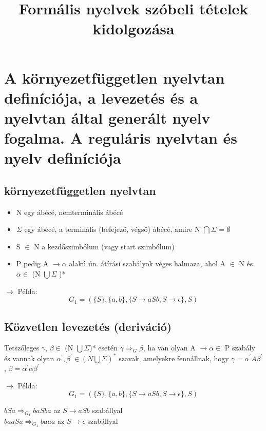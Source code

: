 \documentclass{article}
\title{Formális nyelvek szóbeli tételek kidolgozása}
\begin{document}
    \maketitle
    \newpage
    
    \section{A környezetfüggetlen nyelvtan definíciója, a levezetés és a nyelvtan által generált nyelv fogalma. A reguláris nyelvtan és nyelv definíciója}
    \subsection{környezetfüggetlen nyelvtan}
    \setlength{\parskip}{ 4mm minus 3mm}
    
    \begin{itemize}
        \item N egy ábécé, nemterminális ábécé
        \item $ \Sigma $ egy ábécé, a terminális (befejező, végső) ábécé, amire N $ \bigcap \Sigma $ = $ \emptyset $
        \item S $ \in $ N a kezdőszimbólum (vagy start szimbólum)
        \item P pedig A $ \rightarrow \alpha $  alakú ún. átírási szabályok véges halmaza, ahol A $ \in $ N és $ \alpha \in $ (N $ \bigcup \Sigma $ )*
    \end{itemize}

    $ \rightarrow $ Példa:
    \hspace{\parindent}  \[G_1 =(\{S\},\{a,b\},\{S \rightarrow aSb,S \rightarrow \epsilon\},S)\]

    \subsection{Közvetlen levezetés (deriváció)}

    Tetszőleges $ \gamma $, $ \beta \in $ (N $ \bigcup \Sigma $)* esetén $ \gamma \Rightarrow _G \beta $,
    ha van olyan A $ \rightarrow \alpha \in $ P szabály és vannak olyan $ \alpha^{'}, \beta^{'} \in (N \bigcup \Sigma)^* $ szavak,
    amelyekre fennállnak, hogy $ \gamma = \alpha^{'}A\beta^{'} $, $ \beta = \alpha^{'}\alpha\beta^{'} $ 

    \newblock
    \newline
    $ \rightarrow $ Példa:
    \[G_1 = (\{S\}, \{a, b\}, \{S \rightarrow aSb, S \rightarrow \epsilon\}, S)\]
    \begin{center}
        $ bSa \Rightarrow _{G_1} baSba $ az $ S \rightarrow aSb $ szabállyal\\
        $ baaSa \Rightarrow _{G_1} baaa $ az $ S \rightarrow \epsilon $ szabállyal
    \end{center}
\end{document}
